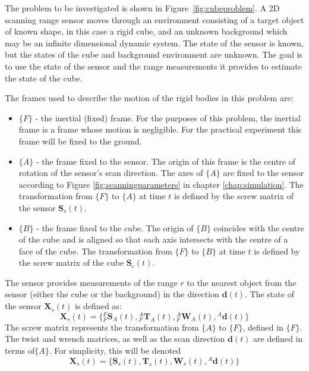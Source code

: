 The problem to be investigated is shown in Figure~\ref{fig:cubeproblem}. A 2D scanning range sensor moves through an environment consisting of a target object of known shape, in this case a rigid cube, and an unknown background which may be an infinite dimensional dynamic system. The state of the sensor is known, but the states of the cube and background environment are unknown. The goal is to use the state of the sensor and the range measurements it provides to estimate the state of the cube.

The frames used to describe the motion of the rigid bodies in this problem are:
\begin{itemize}
\item $\{F\}$ - the inertial (fixed) frame. For the purposes of this problem, the inertial frame is a frame whose motion is negligible. For the practical experiment this frame will be fixed to the ground.
\item $\{A\}$ - the frame fixed to the sensor. The origin of this frame is the centre of rotation of the sensor's scan direction. The axes of $\{A\}$ are fixed to the sensor according to Figure \ref{fig:scanningparameters} in chapter \ref{chap:simulation}. The transformation from $\{F\}$ to $\{A\}$ at time $t$ is defined by the screw matrix of the sensor $\mathbf{S}_{s}(t)$.
\item $\{B\}$ - the frame fixed to the cube. The origin of $\{B\}$ coincides with the centre of the cube and is aligned so that each axis intersects with the centre of a face of the cube. The transformation from $\{F\}$ to $\{B\}$ at time $t$ is defined by the screw matrix of the cube $\mathbf{S}_{c}(t)$.
\end{itemize} 

The sensor provides measurements of the range $r$ to the nearest object from the sensor (either the cube or the background) in the direction $\mathbf{d}(t)$. 
The state of the sensor $\mathbf{X}_{s}(t)$ is defined as:
\begin{equation}
	\mathbf{X}_{s}(t) = 
	\{{^{F}_{F}\mathbf{S}^{}_{A}(t)},{^{A}_{F}\mathbf{T}^{}_{A}(t)},{^{A}_{F}\mathbf{W}^{}_{A}(t)},
	{^{A}\mathbf{d}(t)}\}
\end{equation}
The screw matrix represents the transformation from $\{A\}$ to $\{F\}$, defined in $\{F\}$. The twist and wrench matrices, as well as the scan direction $\mathbf{d}(t)$ are defined in terms of$\{A\}$.
For simplicity, this will be denoted 
\begin{equation}
	\mathbf{X}_{s}(t) = 
	\{\mathbf{S}_{s}(t),\mathbf{T}_{s}(t),\mathbf{W}_{s}(t),{^{A}\mathbf{d}(t)}\}
\end{equation}

